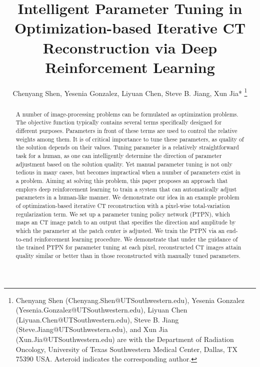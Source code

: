 \documentclass[journal]{IEEEtran}
\begin{document}
\title{Intelligent Parameter Tuning in Optimization-based Iterative CT Reconstruction via Deep Reinforcement Learning}


\author{Chenyang Shen, Yesenia Gonzalez, Liyuan Chen, Steve B. Jiang, Xun Jia*
\thanks{Chenyang Shen (Chenyang.Shen@UTSouthwestern.edu), Yesenia Gonzalez (Yesenia.Gonzalez@UTSouthwestern.edu), Liyuan Chen (Liyuan.Chen@UTSouthwestern.edu), Steve B. Jiang (Steve.Jiang@UTSouthwestern.edu), and Xun Jia (Xun.Jia@UTSouthwestern.edu) are with the Department of Radiation Oncology, University of Texas Southwestern Medical Center, Dallas, TX 75390 USA. Asteroid indicates the corresponding author.}}





\maketitle


\begin{abstract}
A number of image-processing problems can be formulated as optimization problems. The objective function typically contains several terms specifically designed for different purposes. Parameters in front of these terms are used to control the relative weights among them. It is of critical importance to tune these parameters, as quality of the solution depends on their values. Tuning parameter is a relatively straightforward task for a human, as one can intelligently determine the direction of parameter adjustment based on the solution quality. Yet manual parameter tuning is not only tedious in many cases, but becomes impractical when a number of parameters exist in a problem. Aiming at solving this problem, this paper proposes an approach that employs deep reinforcement learning to train a system that can automatically adjust parameters in a human-like manner. We demonstrate our idea in an example problem of optimization-based iterative CT reconstruction with a pixel-wise total-variation regularization term. We set up a parameter tuning policy network (PTPN), which maps an CT image patch to an output that specifies the direction and amplitude by which the parameter at the patch center is adjusted. We train the PTPN via an end-to-end reinforcement learning procedure. We demonstrate that under the guidance of the trained PTPN for parameter tuning at each pixel, reconstructed CT images attain quality similar or better than in those reconstructed with manually tuned parameters. 
\end{abstract}
\end{document}
